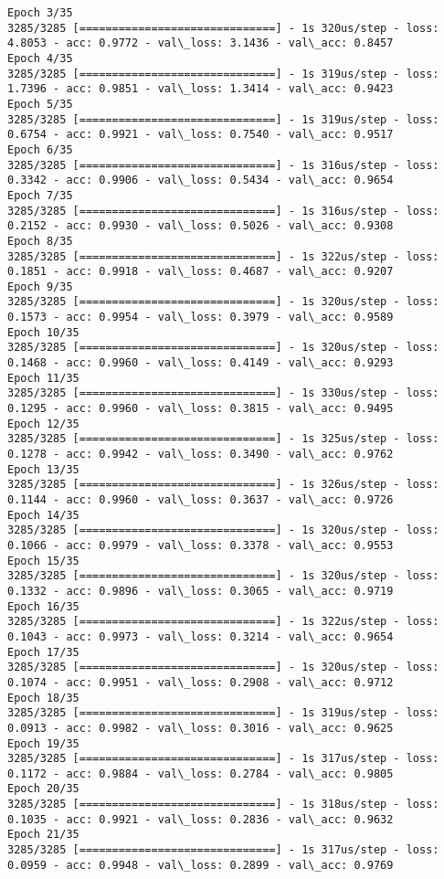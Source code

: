 \documentclass[11pt]{article}
\begin{document}
\begin{Verbatim}[commandchars=\\\{\}]
Epoch 3/35
3285/3285 [==============================] - 1s 320us/step - loss: 4.8053 - acc: 0.9772 - val\_loss: 3.1436 - val\_acc: 0.8457
Epoch 4/35
3285/3285 [==============================] - 1s 319us/step - loss: 1.7396 - acc: 0.9851 - val\_loss: 1.3414 - val\_acc: 0.9423
Epoch 5/35
3285/3285 [==============================] - 1s 319us/step - loss: 0.6754 - acc: 0.9921 - val\_loss: 0.7540 - val\_acc: 0.9517
Epoch 6/35
3285/3285 [==============================] - 1s 316us/step - loss: 0.3342 - acc: 0.9906 - val\_loss: 0.5434 - val\_acc: 0.9654
Epoch 7/35
3285/3285 [==============================] - 1s 316us/step - loss: 0.2152 - acc: 0.9930 - val\_loss: 0.5026 - val\_acc: 0.9308
Epoch 8/35
3285/3285 [==============================] - 1s 322us/step - loss: 0.1851 - acc: 0.9918 - val\_loss: 0.4687 - val\_acc: 0.9207
Epoch 9/35
3285/3285 [==============================] - 1s 320us/step - loss: 0.1573 - acc: 0.9954 - val\_loss: 0.3979 - val\_acc: 0.9589
Epoch 10/35
3285/3285 [==============================] - 1s 320us/step - loss: 0.1468 - acc: 0.9960 - val\_loss: 0.4149 - val\_acc: 0.9293
Epoch 11/35
3285/3285 [==============================] - 1s 330us/step - loss: 0.1295 - acc: 0.9960 - val\_loss: 0.3815 - val\_acc: 0.9495
Epoch 12/35
3285/3285 [==============================] - 1s 325us/step - loss: 0.1278 - acc: 0.9942 - val\_loss: 0.3490 - val\_acc: 0.9762
Epoch 13/35
3285/3285 [==============================] - 1s 326us/step - loss: 0.1144 - acc: 0.9960 - val\_loss: 0.3637 - val\_acc: 0.9726
Epoch 14/35
3285/3285 [==============================] - 1s 320us/step - loss: 0.1066 - acc: 0.9979 - val\_loss: 0.3378 - val\_acc: 0.9553
Epoch 15/35
3285/3285 [==============================] - 1s 320us/step - loss: 0.1332 - acc: 0.9896 - val\_loss: 0.3065 - val\_acc: 0.9719
Epoch 16/35
3285/3285 [==============================] - 1s 322us/step - loss: 0.1043 - acc: 0.9973 - val\_loss: 0.3214 - val\_acc: 0.9654
Epoch 17/35
3285/3285 [==============================] - 1s 320us/step - loss: 0.1074 - acc: 0.9951 - val\_loss: 0.2908 - val\_acc: 0.9712
Epoch 18/35
3285/3285 [==============================] - 1s 319us/step - loss: 0.0913 - acc: 0.9982 - val\_loss: 0.3016 - val\_acc: 0.9625
Epoch 19/35
3285/3285 [==============================] - 1s 317us/step - loss: 0.1172 - acc: 0.9884 - val\_loss: 0.2784 - val\_acc: 0.9805
Epoch 20/35
3285/3285 [==============================] - 1s 318us/step - loss: 0.1035 - acc: 0.9921 - val\_loss: 0.2836 - val\_acc: 0.9632
Epoch 21/35
3285/3285 [==============================] - 1s 317us/step - loss: 0.0959 - acc: 0.9948 - val\_loss: 0.2899 - val\_acc: 0.9769

\end{Verbatim}
\end{document}
